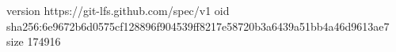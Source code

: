 version https://git-lfs.github.com/spec/v1
oid sha256:6e9672b6d0575cf128896f904539ff8217e58720b3a6439a51bb4a46d9613ae7
size 174916
